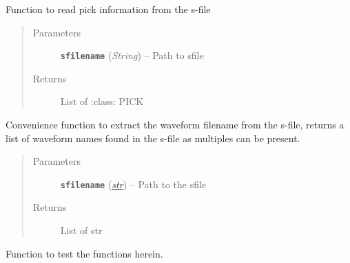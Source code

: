 \documentclass[a4paper,10pt,english]{sphinxmanual}
\begin{document}

\begin{fulllineitems}
\label{utils:Sfile_util.readpicks}
Function to read pick information from the s-file
\begin{quote}\begin{description}
\item[{Parameters}] \leavevmode
\textbf{\texttt{sfilename}} (\emph{String}) -- Path to sfile

\item[{Returns}] \leavevmode
List of :class: PICK

\end{description}\end{quote}

\end{fulllineitems}


\begin{fulllineitems}
\label{utils:Sfile_util.readwavename}
Convenience function to extract the waveform filename from the s-file,
returns a list of waveform names found in the s-file as multiples can
be present.
\begin{quote}\begin{description}
\item[{Parameters}] \leavevmode
\textbf{\texttt{sfilename}} (\href{https://docs.python.org/library/functions.html\#str}{\emph{str}}) -- Path to the sfile

\item[{Returns}] \leavevmode
List of str

\end{description}\end{quote}

\end{fulllineitems}


\begin{fulllineitems}
\label{utils:Sfile_util.test_rw}
Function to test the functions herein.

\end{fulllineitems}
\end{document}
